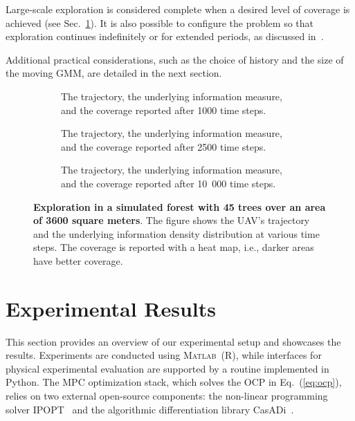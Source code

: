 \documentclass[letterpaper,10pt,conference,twoside]{IEEEtran}
\theoremstyle{definition}
\begin{document}
Large-scale exploration is considered complete when a desired level of coverage is achieved (see Sec.~\ref{sec:res}). It is also possible to configure the problem so that exploration continues indefinitely or for extended periods, as discussed in~\cite{seewald2024energy}. 

Additional practical considerations, such as the choice of history and the size of the moving GMM, are detailed in the next section.



\begin{figure}[t!]
  \centering
  \vspace*{-.1cm}
  \begin{subfigure}[t]{\linewidth}
  \hspace*{-.0cm}
  \caption{The trajectory, the underlying information measure, and the coverage reported after 1000 time steps.}
  \label{fig:1-1}
  \end{subfigure}
  \begin{subfigure}[t]{\linewidth}
  \hspace*{-.05cm}
  \caption{The trajectory, the underlying information measure, and the coverage reported after 2500 time steps.}
  \label{fig:1-2}
  \end{subfigure}
  \begin{subfigure}[t]{\linewidth}
  \hspace*{-.05cm}
  \caption{The trajectory, the underlying information measure, and the coverage reported after 10~000 time steps.}
  \label{fig:1-3}
  \end{subfigure}
  \caption{\textbf{Exploration in a simulated forest with 45 trees over an area of 3600 square meters}. The figure shows the UAV's trajectory and the underlying information density distribution at various time steps. The coverage is reported with a heat map, i.e., darker areas have better coverage.}
  \vspace*{-.4cm}
  \label{fig:1}
\end{figure}


\section{Experimental Results}\label{sec:res}
\noindent
This section provides an overview of our experimental setup and showcases the results. 
Experiments are conducted using \textsc{Matlab}~(R), while interfaces for physical experimental evaluation are supported by a routine implemented in Python. The MPC optimization stack, which solves the OCP in Eq.~(\ref{eq:ocp}), relies on two external open-source components: the non-linear programming solver IPOPT~\cite{wachter2006implementation} and the algorithmic differentiation library CasADi~\cite{andersson2012casadi}.
\end{document}
